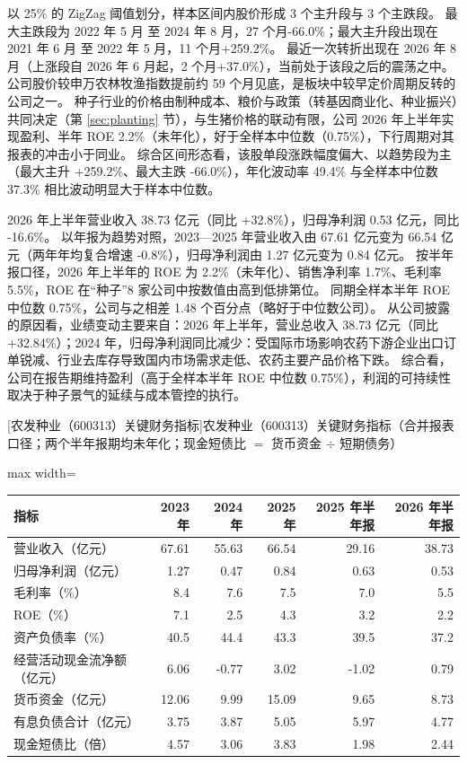  以 25\% 的 ZigZag 阈值划分，样本区间内股价形成 3 个主升段与 3 个主跌段。 最大主跌段为 2022 年 5 月 至 2024 年 8 月，27 个月-66.0\%；最大主升段出现在 2021 年 6 月 至 2022 年 5 月，11 个月+259.2\%。 最近一次转折出现在 2026 年 8 月（上涨段自 2026 年 6 月起，2 个月+37.0\%），当前处于该段之后的震荡之中。 公司股价较申万农林牧渔指数提前约 59 个月见底，是板块中较早定价周期反转的公司之一。 种子行业的价格由制种成本、粮价与政策（转基因商业化、种业振兴）共同决定（第 \ref{sec:planting} 节），与生猪价格的联动有限，公司 2026 年上半年实现盈利、半年 ROE 2.2\%（未年化），好于全样本中位数（0.75\%），下行周期对其报表的冲击小于同业。 综合区间形态看，该股单段涨跌幅度偏大、以趋势段为主（最大主升 +259.2\%、最大主跌 -66.0\%），年化波动率 49.4\% 与全样本中位数 37.3\% 相比波动明显大于样本中位数。

 2026 年上半年营业收入 38.73 亿元（同比 +32.8\%），归母净利润 0.53 亿元，同比 -16.6\%。 以年报为趋势对照，2023---2025 年营业收入由 67.61 亿元变为 66.54 亿元（两年年均复合增速 -0.8\%），归母净利润由 1.27 亿元变为 0.84 亿元。 按半年报口径，2026 年上半年的 ROE 为 2.2\%（未年化）、销售净利率 1.7\%、毛利率 5.5\%，ROE 在“种子”8 家公司中按数值由高到低排第位。 同期全样本半年 ROE 中位数 0.75\%，公司与之相差 1.48 个百分点（略好于中位数公司）。 从公司披露的原因看，业绩变动主要来自：2026 年上半年，营业总收入 38.73 亿元（同比 +32.84\%）；2024 年，归母净利润同比减少：受国际市场影响农药下游企业出口订单锐减、行业去库存导致国内市场需求走低、农药主要产品价格下跌。 综合看，公司在报告期维持盈利（高于全样本半年 ROE 中位数 0.75\%），利润的可持续性取决于种子景气的延续与成本管控的执行。

\begin{center}\small\setlength{\tabcolsep}{3.4pt}
[农发种业（600313）关键财务指标]{农发种业（600313）关键财务指标（合并报表口径；两个半年报期均未年化；现金短债比 $=$ 货币资金 $\div$ 短期债务）}
\begin{adjustbox}{max width=\textwidth}
\begin{tabular}{@{}lrrrrr@{}}
\toprule
指标 & 2023 年 & 2024 年 & 2025 年 & 2025 年半年报 & 2026 年半年报 \\
\midrule
营业收入（亿元） & 67.61 & 55.63 & 66.54 & 29.16 & 38.73 \\
归母净利润（亿元） & 1.27 & 0.47 & 0.84 & 0.63 & 0.53 \\
毛利率（\%） & 8.4 & 7.6 & 7.5 & 7.0 & 5.5 \\
ROE（\%） & 7.1 & 2.5 & 4.3 & 3.2 & 2.2 \\
资产负债率（\%） & 40.5 & 44.4 & 43.3 & 39.5 & 37.2 \\
经营活动现金流净额（亿元） & 6.06 & -0.77 & 3.02 & -1.02 & 0.79 \\
货币资金（亿元） & 12.06 & 9.99 & 15.09 & 9.65 & 8.73 \\
有息负债合计（亿元） & 3.75 & 3.87 & 5.05 & 5.97 & 4.77 \\
现金短债比（倍） & 4.57 & 3.06 & 3.83 & 1.98 & 2.44 \\
\bottomrule
\end{tabular}
\end{adjustbox}
\end{center}

